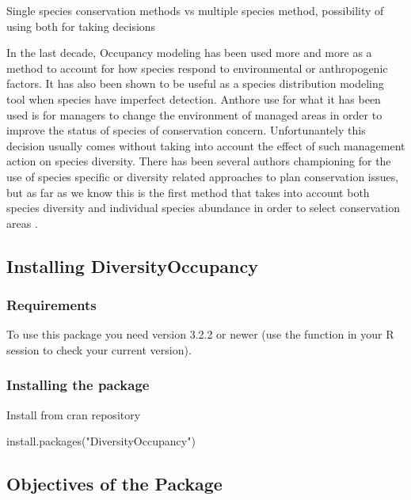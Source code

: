 \documentclass[article]{jss}
\begin{document}
Single species conservation methods vs multiple species method,
possibility of using both for taking decisions

In the last decade, Occupancy modeling has been used more and more as a
method to account for how species respond to environmental or
anthropogenic factors. It has also been shown to be useful as a species
distribution modeling tool when species have imperfect detection.
Anthore use for what it has been used is for managers to change the
environment of managed areas in order to improve the status of species
of conservation concern. Unfortunantely this decision usually comes
without taking into account the effect of such management action on
species diversity. There has been several authors championing for the
use of species specific or diversity related approaches to plan
conservation issues, \citep{mackenzie_estimating_2002} but as far as we
know this is the first method that takes into account both species
diversity and individual species abundance in order to select
conservation areas \citep{mackenzie_estimating_2002}.

\subsection{Installing
DiversityOccupancy}\label{installing-diversityoccupancy}

\subsubsection{Requirements}\label{requirements}

To use this package you need  version 3.2.2 or newer (use
the function  in your R session to check your
current version).

\subsubsection{Installing the package}\label{installing-the-package}

Install from cran repository

\begin{CodeChunk}
\begin{CodeInput}
install.packages("DiversityOccupancy")
\end{CodeInput}
\end{CodeChunk}

\subsection{Objectives of the Package}\label{objectives-of-the-package}
\end{document}
